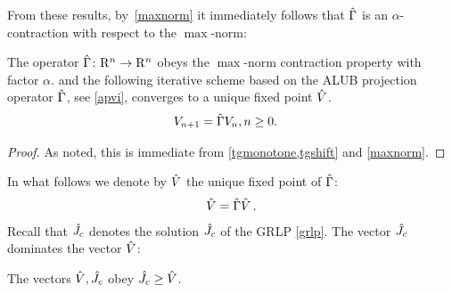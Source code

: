 From these results, by~\cref{maxnorm} it immediately follows that $\hat{\Gamma}$ is an $\alpha$-contraction with respect to the $\max$-norm:
\begin{theorem}\label{tgmaxcontra}
The operator $\hat{\Gamma} \colon \mathrm{R}^n\rightarrow \mathrm{R}^n$ obeys the $\max$-norm contraction property with factor $\alpha$.
 and the following iterative scheme based on the ALUB projection operator $\hat{\Gamma}$, see \eqref{apvi}, converges to a unique fixed point $\hat{V}$.
\begin{align}\label{apvi}
V_{n+1}&=\hg V_n,\mb n\geq 0.
\end{align}
\fi
\end{theorem}
\begin{proof}
As noted, this is immediate from \cref{tgmonotone,tgshift} and \cref{maxnorm}.
\end{proof}
In what follows we denote by $\hat{V}$ the unique fixed point of $\hat{\Gamma}$:
\begin{align*}
\hat{V} = \hat{\Gamma} \hat{V}\,.
\end{align*}
Recall that $\hat{J}_c$ denotes the solution $\hat{J}_c$ of the GRLP \eqref{grlp}. 
The vector $\hat{J}_c$ dominates the vector $\hat{V}$:
\begin{lemma}\label{relation2}
The vectors $\hat{V},\hat{J}_c$ obey $\hat{J}_c\geq\hat{V}$.
\end{lemma}
